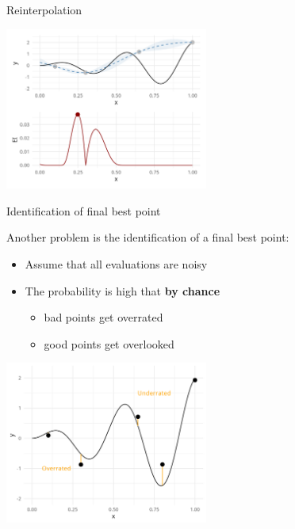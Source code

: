 \documentclass[11pt,compress,t,notes=noshow, xcolor=table]{beamer}
\begin{document}
\begin{vbframe}{Reinterpolation}
\begin{center}
  \includegraphics[width = 0.5\textwidth]{figure_man/noisy_4.png}
\end{center}

\end{vbframe}

\begin{vbframe}{Identification of final best point}

Another problem is the identification of a final best point: 

\begin{itemize}
  \item Assume that all evaluations are noisy
  \item The probability is high that \textbf{by chance}
  \begin{itemize}
    \item bad points get overrated 
    \item good points get overlooked
  \end{itemize}
\end{itemize}


\begin{center}
  \includegraphics[width = 0.5\textwidth]{figure_man/noisy_5.png}
\end{center}

\framebreak 


\end{vbframe}
\end{document}
